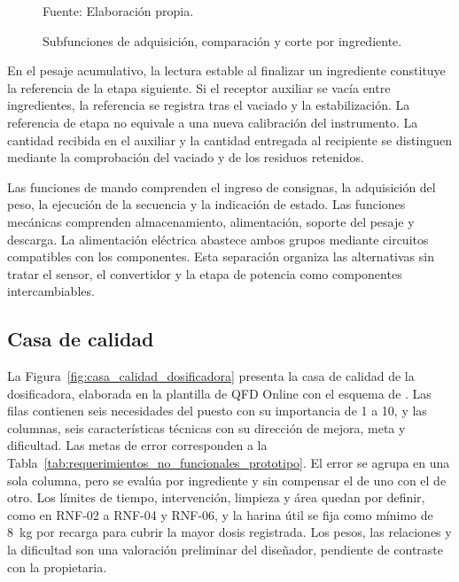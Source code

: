 \begin{figure}[H]
    \centering
    
    \caption{Subfunciones de adquisición, comparación y corte por ingrediente.}
    \label{fig:subfunciones_dosificadora}
    {\footnotesize Fuente: Elaboración propia.}
\end{figure}

En el pesaje acumulativo, la lectura estable al finalizar un ingrediente
constituye la referencia de la etapa siguiente. Si el receptor auxiliar
se vacía entre ingredientes, la referencia se registra tras el vaciado
y la estabilización. La referencia de etapa no equivale a una nueva
calibración del instrumento. La cantidad recibida en el auxiliar y la
cantidad entregada al recipiente se distinguen mediante la comprobación del
vaciado y de los residuos retenidos.

Las funciones de mando comprenden el ingreso de consignas, la
adquisición del peso, la ejecución de la secuencia y la indicación de
estado. Las funciones mecánicas comprenden almacenamiento,
alimentación, soporte del pesaje y descarga. La alimentación eléctrica
abastece ambos grupos mediante circuitos compatibles con los
componentes. Esta separación organiza las alternativas sin tratar el
sensor, el convertidor y la etapa de potencia como componentes
intercambiables.

\subsection{Casa de calidad}
\label{subsec:casa_calidad}

La Figura~\ref{fig:casa_calidad_dosificadora} presenta la casa de
calidad de la dosificadora, elaborada en la plantilla de QFD Online con
el esquema de \textcite{cross2021design}. Las filas contienen seis
necesidades del puesto con su importancia de 1 a 10, y las columnas,
seis características técnicas con su dirección de mejora, meta y
dificultad. Las metas de error corresponden a la
Tabla~\ref{tab:requerimientos_no_funcionales_prototipo}. El error se
agrupa en una sola columna, pero se evalúa por ingrediente y sin
compensar el de uno con el de otro. Los límites de tiempo, intervención,
limpieza y área quedan por definir, como en RNF-02 a RNF-04 y RNF-06, y
la harina útil se fija como mínimo de 8~kg por recarga para cubrir la
mayor dosis registrada. Los pesos, las relaciones y la dificultad son una
valoración preliminar del diseñador, pendiente de contraste con la
propietaria.

